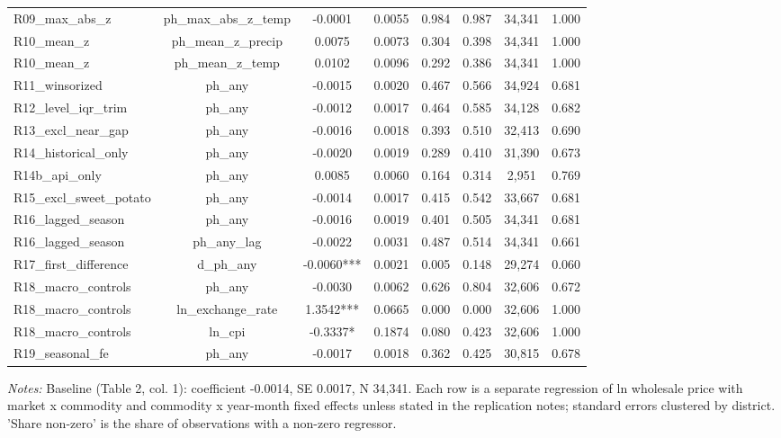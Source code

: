 \begin{table}[htbp]
\begin{tabular}{lccccccc}
R09\_max\_abs\_z & ph\_max\_abs\_z\_temp & -0.0001 & 0.0055 & 0.984 & 0.987 & 34,341 & 1.000 \\
R10\_mean\_z & ph\_mean\_z\_precip & 0.0075 & 0.0073 & 0.304 & 0.398 & 34,341 & 1.000 \\
R10\_mean\_z & ph\_mean\_z\_temp & 0.0102 & 0.0096 & 0.292 & 0.386 & 34,341 & 1.000 \\
R11\_winsorized & ph\_any & -0.0015 & 0.0020 & 0.467 & 0.566 & 34,924 & 0.681 \\
R12\_level\_iqr\_trim & ph\_any & -0.0012 & 0.0017 & 0.464 & 0.585 & 34,128 & 0.682 \\
R13\_excl\_near\_gap & ph\_any & -0.0016 & 0.0018 & 0.393 & 0.510 & 32,413 & 0.690 \\
R14\_historical\_only & ph\_any & -0.0020 & 0.0019 & 0.289 & 0.410 & 31,390 & 0.673 \\
R14b\_api\_only & ph\_any & 0.0085 & 0.0060 & 0.164 & 0.314 & 2,951 & 0.769 \\
R15\_excl\_sweet\_potato & ph\_any & -0.0014 & 0.0017 & 0.415 & 0.542 & 33,667 & 0.681 \\
R16\_lagged\_season & ph\_any & -0.0016 & 0.0019 & 0.401 & 0.505 & 34,341 & 0.681 \\
R16\_lagged\_season & ph\_any\_lag & -0.0022 & 0.0031 & 0.487 & 0.514 & 34,341 & 0.661 \\
R17\_first\_difference & d\_ph\_any & -0.0060*** & 0.0021 & 0.005 & 0.148 & 29,274 & 0.060 \\
R18\_macro\_controls & ph\_any & -0.0030 & 0.0062 & 0.626 & 0.804 & 32,606 & 0.672 \\
R18\_macro\_controls & ln\_exchange\_rate & 1.3542*** & 0.0665 & 0.000 & 0.000 & 32,606 & 1.000 \\
R18\_macro\_controls & ln\_cpi & -0.3337* & 0.1874 & 0.080 & 0.423 & 32,606 & 1.000 \\
R19\_seasonal\_fe & ph\_any & -0.0017 & 0.0018 & 0.362 & 0.425 & 30,815 & 0.678 \\
\bottomrule
\end{tabular}
\begin{minipage}{0.95\linewidth}\footnotesize \textit{Notes:} Baseline (Table 2, col. 1): coefficient -0.0014, SE 0.0017, N 34,341. Each row is a separate regression of ln wholesale price with market x commodity and commodity x year-month fixed effects unless stated in the replication notes; standard errors clustered by district. 'Share non-zero' is the share of observations with a non-zero regressor.\end{minipage}
\end{table}